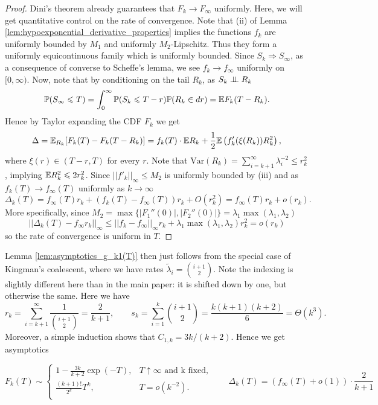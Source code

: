 \begin{subappendices}
  \begin{proof}
          Dini's theorem already guarantees that $F_k \to F_\infty$ uniformly. Here, we will get quantitative control on the rate of convergence. Note that (ii) of Lemma \ref{lem:hypoexponential_derivative_properties} implies the functions $f_k$ are uniformly bounded by $M_1$ and uniformly $M_2$-Lipschitz. Thus they form a uniformly equicontinuous family which is uniformly bounded.  Since $S_k \Rightarrow S_\infty$, as a consequence of \cite{boos1985_converse_scheffe} converse to Scheffe's lemma, we see $f_{k} \to f_{\infty}$ uniformly on $[0, \infty)$. Now, note that by conditioning on the tail $R_k$, as $S_k \perp\!\!\!\perp R_k$
        \[\mathbb{P}(S_\infty \leqslant T) = \int_0^\infty \mathbb{P}(S_k \leqslant T-r) \mathbb{P}(R_k \in dr) = \mathbb{E} F_k(T-R_k).\]
        \noindent Hence by Taylor expanding the CDF $F_{k}$ we get
        \[\Delta = \mathbb{E}_{ R_k} [F_{k}(T) - F_{k}(T-R_k)] = f_{k}(T) \cdot \mathbb{E} R_k + \frac{1}{2}\mathbb{E} \left(f'_{k}(\xi(R_k)) R_k^2\right),\]
        \noindent where $\xi(r) \in (T-r, T)$ for every $r$. Note that $\mathrm{Var}(R_k) = \sum_{i=k+1}^\infty\lambda_i^{-2}\leq r_k^2$, implying $\mathbb{E} R_k^2 \leqslant 2r_k^2$. Since $||f'_{k}||_\infty \leq M_2$ is uniformly bounded by (iii) and as $f_{k}(T) \to f_{\infty}(T)$ uniformly as $k \to \infty$
        \[\Delta_k(T) = f_\infty(T) r_k + (f_k(T) - f_\infty(T))r_k + O(r_k^2) = f_\infty(T) r_k + o(r_k).\]
        \noindent More specifically, since $M_2 = \max \{|F_1''(0)|, |F_2''(0)|\} =  \lambda_1\max(\lambda_1, \lambda_2)$
        \[||\Delta_k(T) - f_\infty r_k||_\infty \leq ||f_k - f_\infty||_\infty r_k + \lambda_1\max(\lambda_1, \lambda_2) r_k^2 = o(r_k)\]
        \noindent so the rate of convergence is uniform in $T$.
  \end{proof}


  Lemma \ref{lem:asymptotics_g_k1(T)} then just follows from the special case of Kingman's coalescent, where we have rates $\tilde{\lambda}_i = \binom{i+1}{2}$. Note the indexing is slightly different here than in the main paper: it is shifted down by one, but otherwise the same. Here we have
%
\[r_k = \sum_{i=k+1}^\infty \frac{1}{\binom{i +1}{2}} = \frac{2}{k+1}, \qquad s_k = \sum_{i=1}^k \binom{i + 1}{2} =  \frac{k(k+1)(k+2)}{6} = \Theta(k^3).\]
%
\noindent Moreover, a simple induction shows that $C_{1,k} = 3k/(k+2)$. Hence we get asymptotics

    \[F_k(T) \sim \begin{cases}
        1-\frac{3k}{k+2}\exp(-T), & T \uparrow \infty  \text{ and k fixed,}\\
        \frac{(k+1)!}{2^k} T^{k}, &  T = o(k^{-2}).\\
    \end{cases} \qquad \Delta_k(T) = (f_\infty(T) + o(1)) \cdot \frac{2}{k+1}\]
\end{subappendices}
